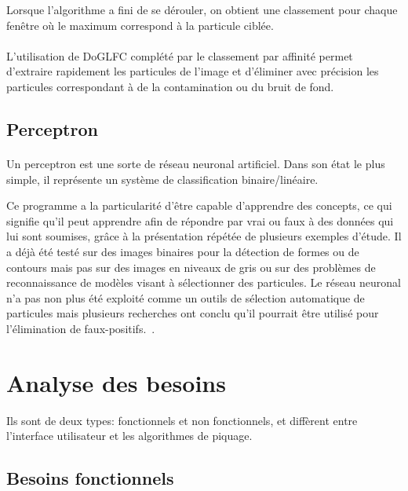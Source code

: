\noindent
Lorsque l'algorithme a fini de se dérouler, on obtient une classement pour chaque fen\^etre où le maximum correspond à la particule ciblée.

\paragraph*{}
L'utilisation de DoGLFC complété par le classement par affinité permet d'extraire
rapidement les particules de l'image et d'éliminer avec précision les particules correspondant à de la contamination ou du bruit de fond.

\subsection{Perceptron}

\paragraph*{}
Un perceptron est une sorte de réseau neuronal artificiel. Dans son état le plus simple, il représente un système de classification binaire/linéaire.%

\noindent
Ce programme a la particularité d'être capable d'apprendre des concepts, ce qui signifie qu'il peut apprendre afin de répondre par vrai ou faux à des données qui lui sont soumises, gr\^ace à la présentation répétée de plusieurs exemples d'étude.
Il a déjà été testé sur des images binaires pour la détection de formes ou de contours mais pas sur des images en niveaux de gris ou sur des problèmes de reconnaissance de modèles visant à sélectionner des particules. Le réseau neuronal n'a pas non plus été exploité comme un outils de sélection automatique de particules mais plusieurs recherches ont conclu qu'il pourrait \^etre utilisé pour l'élimination de faux-positifs.~\cite{Perceptron:article}.%

\section{Analyse des besoins}

\noindent
Ils sont de deux types: fonctionnels et non fonctionnels, et diffèrent entre l'interface utilisateur et les algorithmes de piquage.

\subsection{Besoins fonctionnels}

